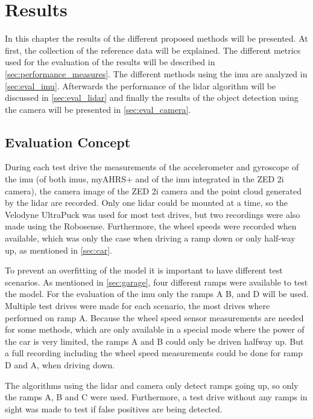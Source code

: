 \chapter{Results}
\label{ch:Results}
In this chapter the results of the different proposed methods will be presented.
At first, the collection of the reference data will be explained.
The different metrics used for the evaluation of the results will be described in \cref{sec:performance_measures}.
The different methods using the \gls{imu} are analyzed in \cref{sec:eval_imu}.
Afterwards the performance of the \gls{lidar} algorithm will be discussed in \cref{sec:eval_lidar} and finally the results of the object detection using the camera will be presented in \cref{sec:eval_camera}.


\section{Evaluation Concept}
During each test drive the measurements of the accelerometer and gyroscope of the \gls{imu} (of both \glspl{imu}, myAHRS+ and of the \gls{imu} integrated in the ZED 2i camera), the camera image of the ZED 2i camera and the point cloud generated by the \gls{lidar} are recorded.
Only one \gls{lidar} could be mounted at a time, so the Velodyne UltraPuck was used for most test drives, but two recordings were also made using the Robosense.
Furthermore, the wheel speeds were recorded when available, which was only the case when driving a ramp down or only half-way up, as mentioned in \cref{sec:car}.\par
To prevent an overfitting of the model it is important to have different test scenarios.
As mentioned in \cref{sec:garage}, four different ramps were available to test the model.
For the evaluation of the \gls{imu} only the ramps A B, and D will be used.
Multiple test drives were made for each scenario, the most drives where performed on ramp A.
Because the wheel speed sensor measurements are needed for some methods, which are only available in a special mode where the power of the car is very limited, the ramps A and B could only be driven halfway up.
But a full recording including the wheel speed measurements could be done for ramp D and A, when driving down.\par
The algorithms using the \gls{lidar} and camera only detect ramps going up, so only the ramps A, B and C were used.
Furthermore, a test drive without any ramps in sight was made to test if false positives are being detected.




